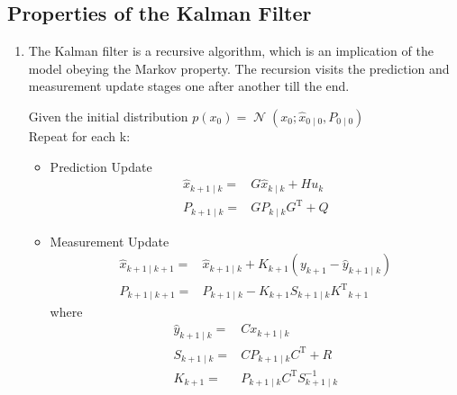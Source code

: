 \documentclass[twoside]{article}
\newcommand{\N}{\operatorname{\mathcal{N}}}
\renewcommand{\t}{^\mathrm{T}{}}
\renewcommand{\k}{_k{}}
\newcommand{\kp}{_{k+1}{}}
\newcommand{\kpk}{_{k+1\mid k}{}}
\newcommand{\kpkp}{_{k+1\mid k+1}{}}
\newcommand{\kk}{_{k\mid k}{}}
\begin{document}
\subsection*{Properties of the Kalman Filter}
\begin{enumerate}
	\item The Kalman filter is a recursive algorithm, which is an implication of the model obeying the Markov property. The recursion visits the prediction and measurement update stages one after another till the end.
\begin{tcolorbox} [colback=red!5!white,colframe=red!75!black,title=\textbf{Kalman Filter Recursion}:,subtitle style={boxrule=0.4pt,
		colback=yellow!50!red!25!white}]
Given the initial distribution $p(x_0) = \N(x_0;\hat x_{0\mid0},P_{0\mid0})$\\ 

Repeat for each k:
	\begin{itemize}
		\item Prediction Update
		\begin{align}
			\hat{x}\kpk =& G \hat x\kk + H u\k \\
			P\kpk =& G P \kk G\t + Q
		\end{align}
		\item Measurement Update
		\begin{align}
			\hat x\kpkp =& \hat x\kpk + K\kp (y\kp - \hat y\kpk)\label{eq:stateMeasurementUpdate}\\
			P\kpkp =& P\kpk - K\kp S\kpk K\t\kp 
		\end{align}
	where
	\begin{align}
		\hat y\kpk =& C x\kpk \\
		S\kpk =& CP\kpk C\t + R\\
		K\kp =& P\kpk C\t S^{-1}\kpk
	\end{align}
	\end{itemize}
	
\end{tcolorbox}


\end{enumerate}
\end{document}
